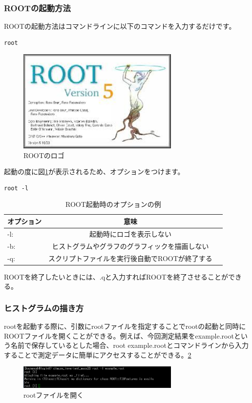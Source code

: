 \documentclass[10pt]{ujarticle}
\begin{document}
\subsubsection{ROOTの起動方法}
ROOTの起動方法はコマンドラインに以下のコマンドを入力するだけです。
\begin{lstlisting}
root
\end{lstlisting}
\begin{figure}[ht]
\begin{center}
\includegraphics[width=8cm]{ROOT_logo.png}
\caption{ROOTのロゴ}
\label{fig:ROOT_logo}
\end{center}
\end{figure}
起動の度に図\ref{fig:ROOT_logo}が表示されるため、オプションをつけます。
\begin{lstlisting}
root -l
\end{lstlisting}
\begin{table}[ht]
  \caption{ROOT起動時のオプションの例}
  \centering
  \begin{tabular}{lcr}
    \hline
    オプション  & 意味 \\
    \hline \hline
      -l:  & 起動時にロゴを表示しない  \\
      -b:  & ヒストグラムやグラフのグラフィックを描画しない \\
      -q:  & スクリプトファイルを実行後自動でROOTが終了する \\
    \hline
  \end{tabular}
\end{table}
ROOTを終了したいときには、.qと入力すればROOTを終了させることができる。

\subsubsection{ヒストグラムの描き方}
rootを起動する際に、引数にrootファイルを指定することでrootの起動と同時にROOTファイルを開くことができる。例えば、今回測定結果をexample.rootという名前で保存しているとした場合、root example.rootとコマンドラインから入力することで測定データに簡単にアクセスすることができる。\ref{fig:open_ROOT}
\begin{figure}[h]
\begin{center}
\includegraphics[width=8cm]{SummerChallenge_open_root.png}
\caption{rootファイルを開く}
\label{fig:open_ROOT}
\end{center}
\end{figure}
\end{document}
